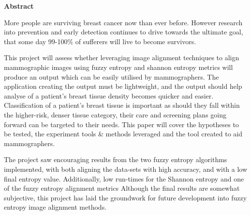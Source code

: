 \thispagestyle{empty}

\begin{center}
    {\LARGE\bf Abstract}
\end{center}

More people are surviving breast cancer now than ever before. However research into prevention and early detection continues to drive towards the ultimate goal, that some day 99-100\% of sufferers will live to become survivors.

This project will assess whether leveraging image alignment techniques to align mammographic images using fuzzy entropy and shannon entropy metrics will produce an output which can be easily utilised by mammographers. The application creating the output must be lightweight, and the output should help analyse of a patient's breast tissue density becomes quicker and easier. Classification of a patient's breast tissue is important as should they fall within the higher-risk, denser tissue category, their care and screening plans going forward can be targeted to their needs. This paper will cover the hypotheses to be tested, the experiment tools \& methods leveraged and the tool created to aid mammographers.

The project saw encouraging results from the two fuzzy entropy algorithms implemented, with both aligning the data-sets with high accuracy, and with a low final entropy value. Additionally, low run-times for the Shannon entropy and one of the fuzzy entropy alignment metrics Although the final results are somewhat subjective, this project has laid the groundwork for future development into fuzzy entropy image alignment methods.
